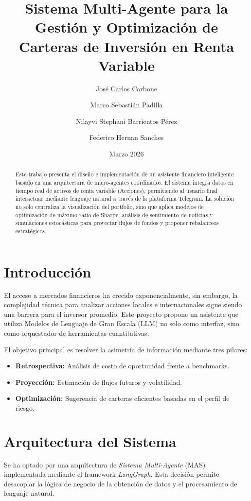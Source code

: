 \documentclass[10pt]{article}
\title{Sistema Multi-Agente para la Gestión y Optimización de Carteras de Inversión en Renta Variable}
\author[1]{José Carlos Carbone}
\author[1]{Marco Sebastián Padilla}
\author[1]{Nilayvi Stephani Barrientos Pérez}
\author[1]{Federico Hernan Sanches}
\affil[1]{Maestría en Inteligencia Artificial}
\date{Marzo 2026}
\begin{document}
\maketitle

\begin{abstract}
Este trabajo presenta el diseño e implementación de un asistente financiero inteligente basado en una arquitectura de micro-agentes coordinados. El sistema integra datos en tiempo real de activos de renta variable (Acciones), permitiendo al usuario final interactuar mediante lenguaje natural a través de la plataforma Telegram. La solución no solo centraliza la visualización del portfolio, sino que aplica modelos de optimización de máximo ratio de Sharpe, análisis de sentimiento de noticias y simulaciones estocásticas para proyectar flujos de fondos y proponer rebalanceos estratégicos.
\end{abstract}

\section{Introducción}
El acceso a mercados financieros ha crecido exponencialmente, sin embargo, la complejidad técnica para analizar acciones locales e internacionales sigue siendo una barrera para el inversor promedio. Este proyecto propone un asistente que utiliza Modelos de Lenguaje de Gran Escala (LLM) no solo como interfaz, sino como orquestador de herramientas cuantitativas.

El objetivo principal es resolver la asimetría de información mediante tres pilares:
\begin{itemize}
    \item \textbf{Retrospectiva:} Análisis de costo de oportunidad frente a benchmarks.
    \item \textbf{Proyección:} Estimación de flujos futuros y volatilidad.
    \item \textbf{Optimización:} Sugerencia de carteras eficientes basadas en el perfil de riesgo.
\end{itemize}

\section{Arquitectura del Sistema}
Se ha optado por una arquitectura de \textit{Sistema Multi-Agente} (MAS) implementada mediante el framework \textit{LangGraph}. Esta decisión permite desacoplar la lógica de negocio de la obtención de datos y el procesamiento de lenguaje natural.
\end{document}
